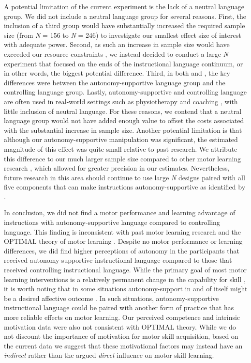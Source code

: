 \documentclass[man,floatsintext,donotrepeattitle,letterpaper,12pt]{apa7}
\begin{document}
A potential limitation of the current experiment is the lack of a neutral language group. We did not include a neutral language group for several reasons. First, the inclusion of a third group would have substantially increased the required sample size (from \emph{N} = 156 to \emph{N} = 246) to investigate our smallest effect size of interest with adequate power. Second, as such an increase in sample size would have exceeded our resource constraints \autocite{lakens2022,lenth2001}, we instead decided to conduct a large \emph{N} experiment that focused on the ends of the instructional language continuum, or in other words, the biggest potential difference. Third, in both \textcite{reeve2011} and \textcite{hooyman2014}, the key differences were between the autonomy-supportive language group and the controlling language group. Lastly, autonomy-supportive and controlling language are often used in real-world settings such as physiotherapy \autocite[e.g.,][]{murray2015} and  coaching \autocite[e.g.,][]{bartholomew2009,carroll2021}, with little inclusion of neutral language. For these reasons, we contend that a neutral language group would not have added enough value to offset the costs associated with the substantial increase in sample size. Another potential limitation is that although our autonomy-supportive manipulation was significant, the estimated magnitude of this effect was quite small relative to past research. We attribute this difference to our much larger sample size compared to other motor learning research \autocite[e.g.,][]{hooyman2014}, which allowed for greater precision in our estimates. Nevertheless, future research in this area should continue to use large \emph{N} designs paired with all five components that can make instructions autonomy-supportive as identified by \textcite{su2011}.

In conclusion, we did not find a motor performance and learning advantage of instructions with autonomy-supportive language compared to controlling language. This finding is inconsistent with past motor learning research \autocite[e.g.,][]{hooyman2014} and the OPTIMAL theory of motor learning \autocite{wulf2016}. Despite no motor performance or learning differences, we did find higher perceptions of autonomy in the participants that received autonomy-supportive instructional language compared to those that received controlling instructional language. While the primary goal of most motor learning interventions is a relatively permanent change in the capability for skill \autocite{schmidt2019}, it is worth noting that in some situations autonomy-support in and of itself might be a desired affective outcome \autocite[e.g.,][]{stemarie2020a}. In such situations, autonomy-supportive instructional language could be paired with another form of practice that has more reliable effects on motor learning. Our perceived competence and intrinsic motivation data were also not consistent with OPTIMAL theory. While we do not discount the importance of motivation for motor skill acquisition, based on the current data we suggest that these motivational factors may instead have an \emph{indirect} \autocite[e.g.,][]{salmoni1984} rather than the argued \emph{direct} \autocite[e.g.,][]{wulf2016} influence on motor skill learning.
\end{document}
